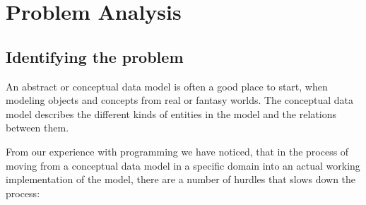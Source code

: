 
\section{Problem Analysis}


\subsection{Identifying the problem}

An abstract or conceptual data model is often a good place to start,
when modeling objects and concepts from real or fantasy worlds. The
conceptual data model describes the different kinds of entities in
the model and the relations between them.

From our experience with programming we have noticed, that in the
process of moving from a conceptual data model in a specific domain
into an actual working implementation of the model, there are a number
of hurdles that slows down the process:
